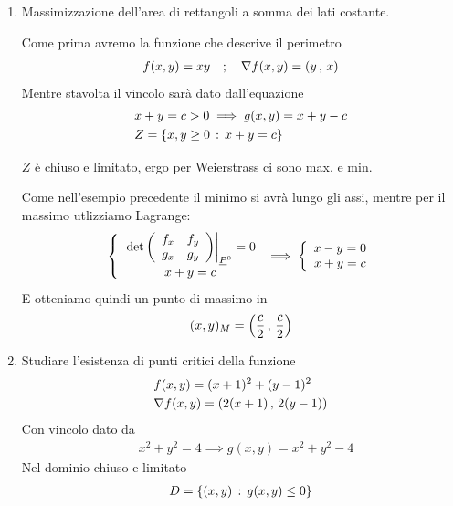 \begin{enumerate}
	\item Massimizzazione dell'area di rettangoli a somma dei lati costante.
	
	\bigskip
	
	Come prima avremo la funzione che descrive il perimetro
	\begin{align}
		f(x,y)=xy \quad ; \quad \nabla f(x,y)= (y \, , \, x)
	\end{align}
	Mentre stavolta il vincolo sarà dato dall'equazione
	\begin{align}
		{}&x+y=c>0 \implies g(x,y)= x+y-c\\
		& Z=\{ x,y \geq 0 \, : \, x+y=c \}
	\end{align}
	
	\begin{figure}[!htb]
	\end{figure}	
	
	$Z$ è chiuso e limitato, ergo per Weierstrass ci sono max. e min.
	
	Come nell'esempio precedente il minimo si avrà lungo gli assi, mentre per il massimo utlizziamo Lagrange:
	\begin{align}
		\left\{\begin{array}{cc} \left.\det\left( \begin{array}{ccc} f_x & f_y \\ g_x & g_y \end{array} \right)\right|_{\underline{P}^0}=0 \\ x+y=c \end{array}\right. \implies
		\left\{\begin{array}{cc} x-y=0 \\ x+y=c \end{array}\right.
	\end{align}
	E otteniamo quindi un punto di massimo in
	\begin{align}
		(x,y)_M= \left( \frac{c}{2} \, , \, \frac{c}{2} \right)
	\end{align}
	
	\bigskip
	
	\item Studiare l'esistenza di punti critici della funzione
	\begin{align}
		{}&f(x,y)= (x+1)^2 + (y-1)^2 \\ 
		&\nabla f(x,y) = (2(x+1) \, , \, 2(y-1))
	\end{align}
	Con vincolo dato da
	\begin{align}
		{}&x^2 + y^2 = 4 \implies g(x,y)=x^2 + y^2 - 4
	\end{align}	
	Nel dominio chiuso e limitato
	\begin{align}
		D = \{ (x,y) \, : \, g(x,y)\leq 0 \}
	\end{align}
	

\end{enumerate}
